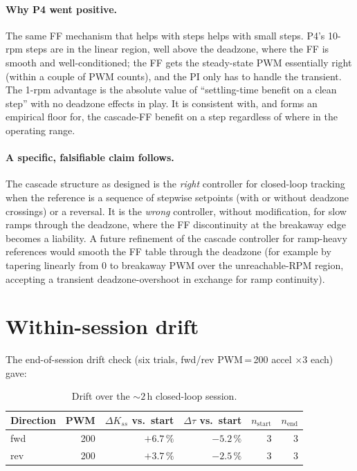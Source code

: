 \paragraph{Why P4 went positive.} The same FF mechanism that helps with steps helps with small steps. P4's 10-rpm steps are in the linear region, well above the deadzone, where the FF is smooth and well-conditioned; the FF gets the steady-state PWM essentially right (within a couple of PWM counts), and the PI only has to handle the transient. The 1-rpm advantage is the absolute value of ``settling-time benefit on a clean step'' with no deadzone effects in play. It is consistent with, and forms an empirical floor for, the cascade-FF benefit on a step regardless of where in the operating range.

\paragraph{A specific, falsifiable claim follows.} The cascade structure as designed is the \emph{right} controller for closed-loop tracking when the reference is a sequence of stepwise setpoints (with or without deadzone crossings) or a reversal. It is the \emph{wrong} controller, without modification, for slow ramps through the deadzone, where the FF discontinuity at the breakaway edge becomes a liability. A future refinement of the cascade controller for ramp-heavy references would smooth the FF table through the deadzone (for example by tapering linearly from 0 to breakaway PWM over the unreachable-RPM region, accepting a transient deadzone-overshoot in exchange for ramp continuity).

\section{Within-session drift}
\label{sec:cl-drift}

The end-of-session drift check (six trials, fwd/rev PWM\,=\,200 accel $\times 3$ each) gave:

\begin{table}[h]
\centering
\begin{tabular}{lrrrrr}
\toprule
Direction & PWM & $\Delta K_{ss}$ vs.\ start & $\Delta \tau$ vs.\ start & $n_{\text{start}}$ & $n_{\text{end}}$ \\
\midrule
fwd & 200 & $+6.7\,\%$ & $-5.2\,\%$ & 3 & 3 \\
rev & 200 & $+3.7\,\%$ & $-2.5\,\%$ & 3 & 3 \\
\bottomrule
\end{tabular}
\caption{Drift over the ${\sim}2$\,h closed-loop session.}
\label{tab:cl-drift}
\end{table}

